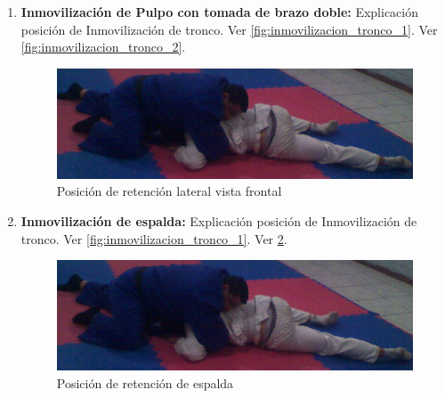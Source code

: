 \begin{enumerate}
	\item \textbf{Inmovilización de Pulpo con tomada de brazo doble:} Explicación posición de Inmovilización de tronco. Ver \ref{fig:inmovilizacion_tronco_1}. Ver \ref{fig:inmovilizacion_tronco_2}.
	\begin{figure}[h]
		\centering
		\begin{minipage}{0.45\textwidth}
			\includegraphics[width=\linewidth]{images/Lucha_de_Piso/16_inmovilizacion_pecho.png}
			\caption{Posición de retención lateral vista frontal}
			\label{fig:inmovilizacion_pulpo_arriba_tomada_de brazo_doble}
		\end{minipage}
		\hfill
	\end{figure}

	\item \textbf{Inmovilización de espalda:} Explicación posición de Inmovilización de tronco. Ver \ref{fig:inmovilizacion_tronco_1}. Ver \ref{fig:inmovilizacion_de_espalda}.
	\begin{figure}[h]
		\centering
		\begin{minipage}{0.45\textwidth}
			\includegraphics[width=\linewidth]{images/Lucha_de_Piso/16_inmovilizacion_pecho.png}
			\caption{Posición de retención de espalda}
			\label{fig:inmovilizacion_de_espalda}
		\end{minipage}
		\hfill
	\end{figure}

\end{enumerate}

